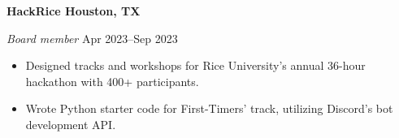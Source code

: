 \textbf{HackRice \hfill Houston, TX}\par
\textit{Board member} \hfill Apr 2023--Sep 2023

\begin{itemize}
	\item Designed tracks and workshops for Rice University's annual 36-hour hackathon with 400+ participants.
	\item Wrote Python starter code for First-Timers' track, utilizing Discord's bot development API.
\end{itemize}\par